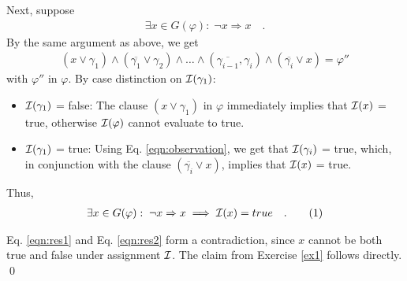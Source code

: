 \documentclass [11pt]{article}
\newcommand{\Ra}{\Rightarrow}
\newcommand{\compl}[1]{\overline{#1}}
\renewcommand{\phi}{\varphi}
\def\II{{\cal I}}
\def\ox{\neg x}
\def\g{\gamma}
\newcommand\numberthis{\addtocounter{equation}{1}\tag{\theequation}}
\newcommand\neqn[1]{\numberthis\label{eqn:#1}}
\begin{document}
\bigskip
\noindent
Next, suppose 
\begin{align}
\exists x \in G(\phi):\;\ox \Ra  x \quad .
\end{align}
By the same argument as above, we get
\begin{align}
(x \lor \g_1) \land (\compl{\g_1} \lor \g_2) \land \dots \land (\compl{\g_{i-1}}, \g_i) \land (\compl{\g_i} \lor x) = \phi''
\end{align}
with $\phi''$ in $\phi$. By case distinction on $\II(\g_1)$:
\begin{itemize}
\item ${\cal I}(\g_1)$ = false: The clause $(x \lor \g_1)$ in $\phi$ immediately implies that ${\cal I}(x)$ = true, otherwise ${\cal I}(\phi)$ cannot evaluate to true.
\item ${\cal I}(\g_1)$ = true: Using Eq. \ref{eqn:observation}, we get that ${\cal I}(\g_i)$ = true, which, in conjunction with the clause $(\compl{\g_i} \lor x)$, implies that ${\cal I}(x)$ = true.
\end{itemize}
Thus, 
\begin{align}
\exists x \in G(\phi):\;\ox \Ra  x \implies {\cal I}(x) = true\quad . \neqn{res2}
\end{align}

Eq. \ref{eqn:res1} and Eq. \ref{eqn:res2} form a contradiction, since $x$ cannot be both true and false under assignment  ${\cal I}$. The claim from Exercise \ref{ex1} follows directly.
\qed

\bigskip
\end{document}
